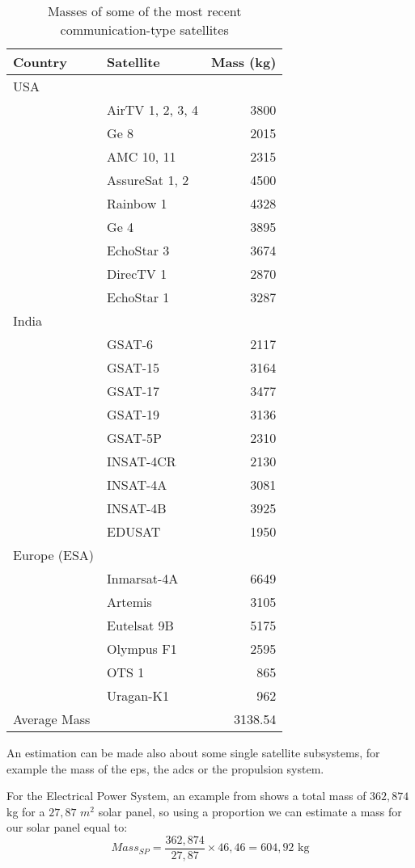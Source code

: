 	\begin{table}
		\centering
		\begin{tabular}{llr}
			\toprule
			Country & Satellite & Mass (kg)\\
			\midrule
				USA & & \\
				& AirTV 1, 2, 3, 4 & 3800\\
				& Ge 8 & 2015\\
				& AMC 10, 11 & 2315\\
				& AssureSat 1, 2 & 4500\\
				& Rainbow 1 & 4328\\
				& Ge 4 & 3895\\
				& EchoStar 3 & 3674\\
				& DirecTV 1 & 2870\\
				& EchoStar 1 & 3287\\
				India & & \\
				& GSAT-6 & 2117\\
				& GSAT-15 & 3164\\
				& GSAT-17 & 3477\\
				& GSAT-19 & 3136\\
				& GSAT-5P & 2310\\
				& INSAT-4CR & 2130\\
				& INSAT-4A & 3081\\
				& INSAT-4B & 3925\\
				& EDUSAT & 1950\\
				Europe (ESA) & & \\
				& Inmarsat-4A & 6649\\
				& Artemis & 3105\\
				& Eutelsat 9B & 5175\\
				& Olympus F1 & 2595\\
				& OTS 1 & 865\\
				& Uragan-K1 & 962\\
			\midrule
			Average Mass & & 3138.54\\
			\bottomrule
		\end{tabular}
		\caption{Masses of some of the most recent communication-type satellites}
		\label{tab:totmass}
	\end{table}
An estimation can be made also about some single satellite subsystems, for example the mass of the \gls{eps}, the \gls{adcs} or the propulsion system.

For the Electrical Power System, an example from \cite{Fox2008} shows a total mass of $362,874$ kg for a $27,87$ $m^2$ solar panel, so using a proportion we can estimate a mass for our solar panel equal to:
\begin{equation}
	Mass_{SP} = \frac{362,874}{27,87}\times 46,46 = 604,92 \text{ kg}
\end{equation}

